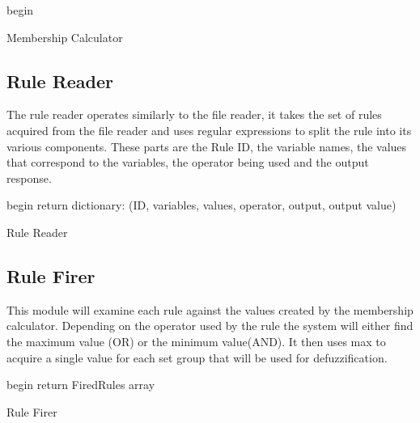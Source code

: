 \documentclass{article}
\begin{document}
\begin{algorithm}[H]
\SetAlgoLined
{}
 begin\;
 \caption{Membership Calculator}
\end{algorithm}

\subsection{Rule Reader}
The rule reader operates similarly to the file reader, it takes the set of rules acquired from the file reader and uses regular expressions to split the rule into its various components. These parts are the Rule ID, the variable names, the values that correspond to the variables, the operator being used and the output response.

\begin{algorithm}[H]
\SetAlgoLined
{}
 begin\;
 return dictionary: (ID, variables, values, operator, output, output value)
 \caption{Rule Reader}
\end{algorithm}

\subsection{Rule Firer}
This module will examine each rule against the values created by the membership calculator. Depending on the operator used by the rule the system will either find the maximum value (OR) or the minimum value(AND). It then uses max to acquire a single value for each set group that will be used for defuzzification. 

\begin{algorithm}[H]
\SetAlgoLined
{}
 begin\;
 return FiredRules array
 \caption{Rule Firer}
\end{algorithm}
\end{document}
